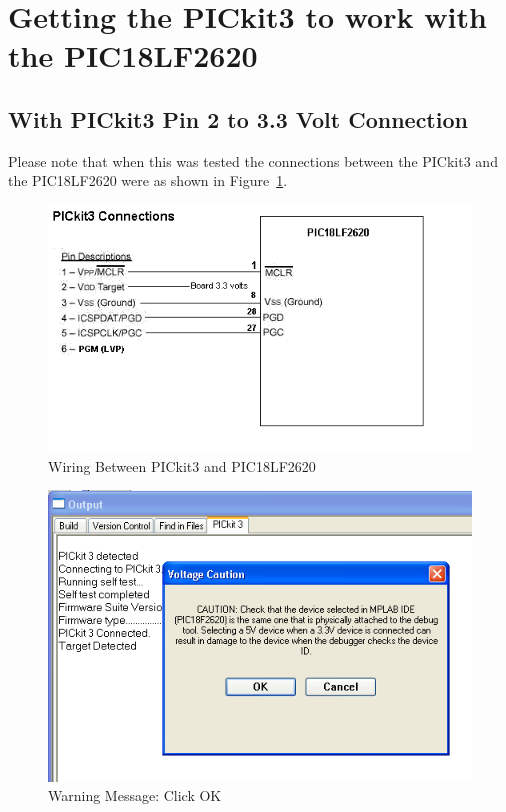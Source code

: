 \documentclass[twocolumn]{article}
\makeatletter
\def\maxwidth{\ifdim\Gin@nat@width>\linewidth\linewidth
\else\Gin@nat@width\fi}
\let\Oldincludegraphics\includegraphics
\renewcommand{\includegraphics}[1]{\Oldincludegraphics[width=\maxwidth]{#1}}
\makeatother
\begin{document}
\section{Getting the PICkit3 to work with the PIC18LF2620}

\subsection{With PICkit3 Pin 2 to 3.3 Volt Connection}

Please note that when this was tested the connections between the
PICkit3 and the PIC18LF2620 were as shown in Figure~\ref{pickit3wiring}.

\begin{figure}[htbp]
\centering
\includegraphics{phys1600/pickit3_connections.png}
\caption{Wiring Between PICkit3 and PIC18LF2620}
\label{pickit3wiring}
\end{figure}

\begin{figure}[htbp]
\centering
\includegraphics{phys1600/pickit3_on_connect.png}
\caption{Warning Message: Click OK}
\label{warningok}
\end{figure}
\end{document}
